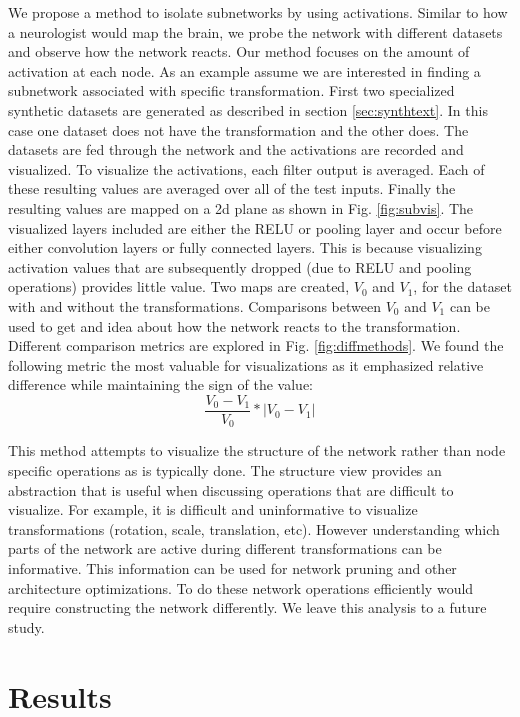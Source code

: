 \documentclass[10pt,twocolumn,letterpaper]{article}
\begin{document}
We propose a method to isolate subnetworks by using activations. Similar to how a neurologist would map the brain, we probe the network with different datasets and observe how the network reacts. Our method focuses on the amount of activation at each node. As an example assume we are interested in finding a subnetwork associated with specific transformation. First two specialized synthetic datasets are generated as described in section \ref{sec:synthtext}. In this case one dataset does not have the transformation and the other does. The datasets are fed through the network and the activations are recorded and visualized. To visualize the activations, each filter output is averaged. Each of these resulting values are averaged over all of the test inputs. Finally the resulting values are mapped on a 2d plane as shown in Fig. \ref{fig:subvis}. The visualized layers included are either the RELU or pooling layer and occur before either convolution layers or fully connected layers. This is because visualizing activation values that are subsequently dropped (due to RELU and pooling operations) provides little value. Two maps are created, $V_0$ and $V_1$, for the dataset with and without the transformations. Comparisons between $V_0$ and $V_1$ can be used to get and idea about how the network reacts to the transformation. Different comparison metrics are explored in Fig. \ref{fig:diffmethods}. We found the following metric the most valuable for visualizations as it emphasized relative difference while maintaining the sign of the value:
\begin{equation} \label{eq:1}
\frac{V_0-V_1}{V_0} * |V_0-V_1|
\end{equation}


This method attempts to visualize the structure of the network rather than node specific operations as is typically done. The structure view provides an abstraction that is useful when discussing operations that are difficult to visualize. For example, it is difficult and uninformative to visualize transformations (rotation, scale, translation, etc). However understanding which parts of the network are active during different transformations can be informative. This information can be used for network pruning and other architecture optimizations. To do these network operations efficiently would require constructing the network differently. We leave this analysis to a future study.

\section{Results}
\end{document}
